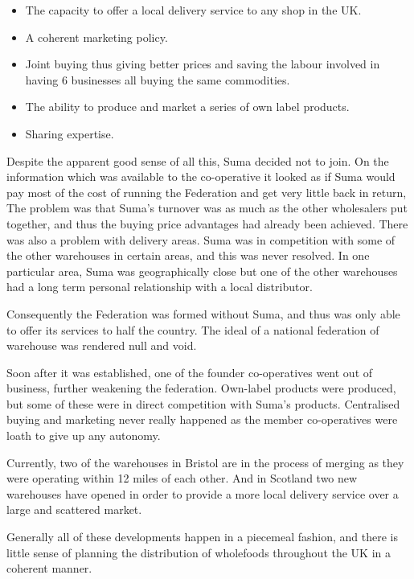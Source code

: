 \begin{itemize}
  \item The capacity to offer a local delivery service to any shop in the UK.

  \item A coherent marketing policy.

  \item Joint buying thus giving better prices and saving the labour involved in having 6 businesses all buying the same commodities.

  \item The ability to produce and market a series of own label products.

  \item Sharing expertise.

\end{itemize}

Despite the apparent good sense of all this, Suma decided not to join. On the information which was available to the co-operative it looked as if Suma would pay most of the cost of running the Federation and get very little back in return, The problem was that Suma's turnover was as much as the other wholesalers put together, and thus the buying price advantages had already been achieved. There was also a problem with delivery areas. Suma was in competition with some of the other warehouses in certain areas, and this was never resolved. In one particular area, Suma was geographically close but one of the other warehouses had a long term personal relationship with a local distributor.

Consequently the Federation was formed without Suma, and thus was only able to offer its services to half the country. The ideal of a national federation of warehouse was rendered null and void.

Soon after it was established, one of the founder co-operatives went out of business, further weakening the federation. Own-label products were produced, but some of these were in direct competition with Suma's products. Centralised buying and marketing never really happened as the member co-operatives were loath to give up any autonomy.

Currently, two of the warehouses in Bristol are in the process of merging as they were operating within 12 miles of each other. And in Scotland two new warehouses have opened in order to provide a more local delivery service over a large and scattered market.

Generally all of these developments happen in a piecemeal fashion, and there is little sense of planning the distribution of wholefoods throughout the UK in a coherent manner.

